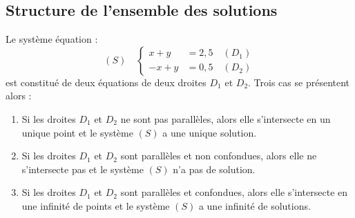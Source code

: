 \documentclass[a4paper]{book}
\begin{document}
\subsection{Structure de l'ensemble des solutions}
Le système équation :
$$(S)\quad \begin{cases}
x+y&=2,5\quad(D_1)\\
-x+y&=0,5\quad(D_2)
\end{cases}$$
est constitué de deux équations de deux droites $D_1$ et $D_2$. 
Trois cas se présentent alors :
\begin{enumerate}
\item Si les droites $D_1$ et $D_2$ ne sont pas parallèles, alors elle s'intersecte en un unique point et le système $(S)$ a une
unique solution.
\begin{center}
\end{center}
\item Si les droites $D_1$ et $D_2$  sont parallèles et non confondues, alors elle ne s'intersecte pas et le système $(S)$ n'a pas de solution.
\begin{center}
\end{center}
\item Si les droites $D_1$ et $D_2$  sont parallèles et  confondues, alors elle s'intersecte en une infinité de points et le système $(S)$ a une infinité de solutions.
\begin{center}
\end{center}
\end{enumerate} 
\end{document}

